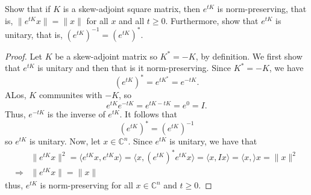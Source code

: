 \documentclass{exam}
\newcommand{\CC}{\mathbb C}
\begin{document}
\begin{questions}
        \question Show that if $K$ is a skew-adjoint square matrix, then $e^{tK}$ is norm-preserving, that is, $\|e^{tK}x\| = \|x\|$ for all $x$ and all $t \geq 0$. Furthermore, show that $e^{tK}$ is unitary, that is, $\left(e^{tK}\right)^{-1} = \left(e^{tK}\right)^{*}$.
        \begin{solution}
            \begin{proof}
                Let $K$ be a skew-adjoint matrix so $K^{*} = -K$, by definition. We first show that $e^{tK}$ is unitary and then that is it norm-preserving. Since $K^{*} = -K$, we have 
                \[
                    \left(e^{tK}\right)^{*} = e^{tK^{*}} = e^{-tK}. 
                \]
                ALos, $K$ communites with $-K$, so 
                \[
                    e^{tK}e^{-tK} = e^{tK - tK} = e^{0} = I. 
                \]
                Thus, $e^{-tK}$ is the inverse of $e^{tK}$. It follows that 
                \[
                    \left(e^{tK}\right)^{*} = \left(e^{tK}\right)^{-1}
                \]
                so $e^{tK}$ is unitary. Now, let $x \in \CC^n$. Since $e^{tK}$ is unitary, we have that 
                \begin{align*}
                    & \| e^{tK}x \|^2 = \langle e^{tK}x, e^{tK}x \rangle = \langle x, \left(e^{tK}\right)^{*}e^{tK}x\rangle = \langle x, Ix \rangle = \langle x, \rangle x = \| x \|^2 \\
                    \Rightarrow& \| e^{tK}x \| = \| x \|
                \end{align*}
                thus, $e^{tK}$ is norm-preserving for all $x \in \CC^n$ and $t \geq 0$.
            \end{proof}
        \end{solution}


\end{questions}
\end{document}
